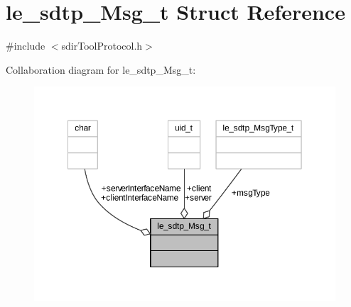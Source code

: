 \hypertarget{structle__sdtp___msg__t}{}\section{le\+\_\+sdtp\+\_\+\+Msg\+\_\+t Struct Reference}
\label{structle__sdtp___msg__t}


{\ttfamily \#include $<$sdir\+Tool\+Protocol.\+h$>$}



Collaboration diagram for le\+\_\+sdtp\+\_\+\+Msg\+\_\+t\+:
\nopagebreak
\begin{figure}[H]
\begin{center}
\leavevmode
\includegraphics[width=350pt]{structle__sdtp___msg__t__coll__graph}
\end{center}
\end{figure}
